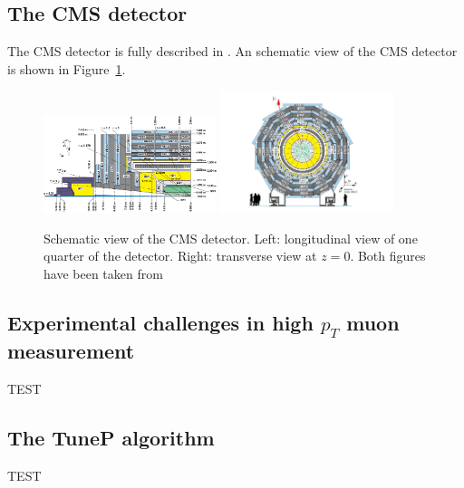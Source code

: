 
\subsection{The CMS detector}\label{cms}

The CMS detector is fully described in \cite{DTperformance}. An schematic view of the CMS detector is shown in Figure~\ref{fig:CMS}.

\begin{figure}
\centering
\includegraphics[width=0.45\textwidth]{figures/CMSview1.png}
\includegraphics[width=0.45\textwidth]{figures/CMSview.png}
\caption{Schematic view of the CMS detector. Left: longitudinal view of one quarter of the detector. Right: transverse view at $z = 0$. Both figures have been taken from \cite{DTperformance}}
\label{fig:CMS}
\end{figure}



\subsection{Experimental challenges in high $p_{T}$ muon measurement}\label{challenges}

TEST

\subsection{The TuneP algorithm}\label{TuneP}

TEST

